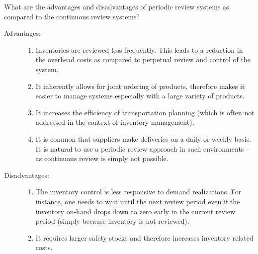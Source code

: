 \begin{exercise}
What are the advantages and disadvantages of periodic review systems as compared to the continuous review systems?


\begin{solution}
\begin{description}
\item[Advantages:] 
\begin{enumerate}
\item Inventories are reviewed less frequently. This leads to a reduction in the overhead costs as compared to perpetual review and control of the system.
\item It inherently allows for joint ordering of products, therefore makes it easier to manage systems especially with a large variety of products. 
\item It increases the efficiency of transportation planning (which is often not addressed in the context of inventory management).
\item It is common that suppliers make deliveries on a daily or weekly basis. It is natural to use a periodic review approach in such environments -- as continuous review is simply not possible.
\end{enumerate}
\item[Disadvantages:]
\begin{enumerate}
\item The inventory control is less responsive to demand realizations. For instance, one needs to wait until the next review period even if the inventory on-hand drops down to zero early in the current review period (simply because inventory is not reviewed). 
\item It requires larger safety stocks and therefore increases inventory related costs.
\end{enumerate}
\end{description}
\end{solution}
\end{exercise}

